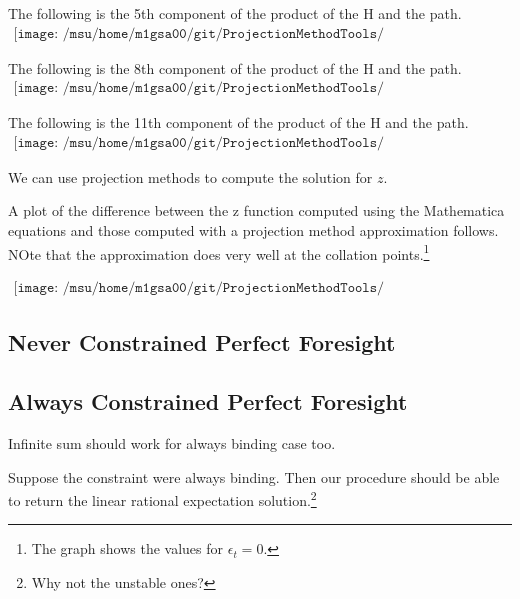 \documentclass[12pt]{article}
\begin{document}
The following is the 5th component of the product of the H and the path.
\begin{gather*}
\texttt{[image: /msu/home/m1gsa00/git/ProjectionMethodTools/ProjectionMethodToolsJava/code/prettyhapp04B.pdf]}
\end{gather*}

The following is the 8th component of the product of the H and the path.
\begin{gather*}
\texttt{[image: /msu/home/m1gsa00/git/ProjectionMethodTools/ProjectionMethodToolsJava/code/prettyhapp04C.pdf]}
\end{gather*}


The following is the 11th component of the product of the H and the path.
\begin{gather*}
\texttt{[image: /msu/home/m1gsa00/git/ProjectionMethodTools/ProjectionMethodToolsJava/code/prettyhapp04D.pdf]}
\end{gather*}


We can use projection methods to compute the solution for $z$.

A plot of the difference between the z function computed using the Mathematica equations and those computed with a projection method approximation follows. NOte that the approximation does very well at the collation points.\footnote{The graph shows the values for $\epsilon_t=0$.}


\begin{gather*}
\texttt{[image: /msu/home/m1gsa00/git/ProjectionMethodTools/ProjectionMethodToolsJava/code/prettyNumDiff04.pdf]}
\end{gather*}







\subsection{Never Constrained Perfect Foresight}
\label{sec:never-constr-perf}

\subsection{Always Constrained Perfect Foresight}
\label{sec:never-constr-perf}
Infinite sum should work for always binding case too.



Suppose the constraint were always binding.  
Then our procedure should be able to return the linear rational expectation
solution.\footnote{Why not the unstable ones?}
\end{document}
